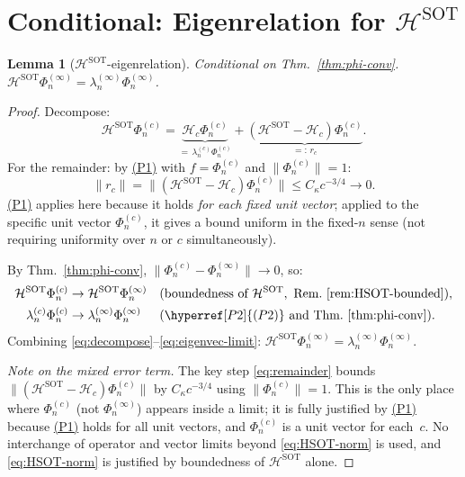 \documentclass[12pt,a4paper]{amsart}
\newtheorem{lemma}[theorem]{Lemma}
\theoremstyle{definition}
\theoremstyle{remark}
\newcommand{\Hc}{\mathcal{H}_c}
\newcommand{\HSOT}{\mathcal{H}^{\mathrm{SOT}}}
\begin{document}
\section{Conditional: Eigenrelation for $\HSOT$}
\label{sec:eigenrelation}

\begin{lemma}[$\HSOT$-eigenrelation]
\label{lem:weak-eigenrelation}
\emph{Conditional on Thm.~\ref{thm:phi-conv}.}
$\HSOT\Phi_n^{(\infty)}=\lambda_n^{(\infty)}\Phi_n^{(\infty)}$.
\end{lemma}

\begin{proof}
Decompose:
\begin{equation}\label{eq:decompose}
  \HSOT\Phi_n^{(c)}
  = \underbrace{\Hc\Phi_n^{(c)}}_{=\,\lambda_n^{(c)}\Phi_n^{(c)}}
  + \underbrace{(\HSOT-\Hc)\Phi_n^{(c)}}_{=:\,r_c}.
\end{equation}
For the remainder: by \hyperref[P1]{(P1)} with $f=\Phi_n^{(c)}$
and $\|\Phi_n^{(c)}\|=1$:
\begin{equation}\label{eq:remainder}
  \|r_c\| = \|(\HSOT-\Hc)\Phi_n^{(c)}\|
  \le C_\kappa c^{-3/4} \to 0.
\end{equation}
\hyperref[P1]{(P1)} applies here because it holds
\emph{for each fixed unit vector};
applied to the specific unit vector $\Phi_n^{(c)}$,
it gives a bound uniform in the fixed-$n$ sense
(not requiring uniformity over $n$ or $c$ simultaneously).

By Thm.~\ref{thm:phi-conv},
$\|\Phi_n^{(c)}-\Phi_n^{(\infty)}\|\to 0$, so:
\begin{align}
  \HSOT\Phi_n^{(c)}&\to\HSOT\Phi_n^{(\infty)}
  \label{eq:HSOT-norm}
  && (\text{boundedness of }\HSOT,
     \text{ Rem.~\ref{rem:HSOT-bounded}}),\\
  \lambda_n^{(c)}\Phi_n^{(c)}&\to
  \lambda_n^{(\infty)}\Phi_n^{(\infty)}
  \label{eq:eigenvec-limit}
  && (\hyperref[P2]{(P2)}\text{ and Thm.~\ref{thm:phi-conv}}).
\end{align}
Combining \eqref{eq:decompose}--\eqref{eq:eigenvec-limit}:
$\HSOT\Phi_n^{(\infty)}
=\lambda_n^{(\infty)}\Phi_n^{(\infty)}$.

\medskip
\noindent\textit{Note on the mixed error term.}
The key step \eqref{eq:remainder} bounds
$\|(\HSOT-\Hc)\Phi_n^{(c)}\|$ by $C_\kappa c^{-3/4}$
using $\|\Phi_n^{(c)}\|=1$.
This is the only place where $\Phi_n^{(c)}$ (not
$\Phi_n^{(\infty)}$) appears inside a limit;
it is fully justified by \hyperref[P1]{(P1)}
because \hyperref[P1]{(P1)} holds for all unit vectors,
and $\Phi_n^{(c)}$ is a unit vector for each~$c$.
No interchange of operator and vector limits
beyond \eqref{eq:HSOT-norm} is used,
and \eqref{eq:HSOT-norm} is justified by
boundedness of $\HSOT$ alone.
\end{proof}
\end{document}
